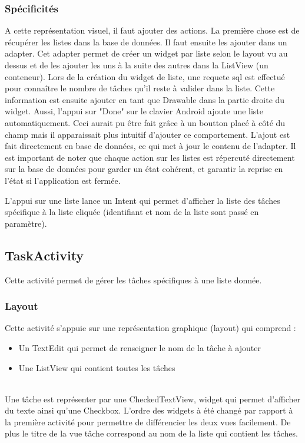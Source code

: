 \documentclass[a4paper, 11pt, french]{report}
\begin{document}
	\subsubsection{Spécificités}
	A cette représentation visuel, il faut ajouter des actions. 
	La première chose est de récupérer les listes dans la base de données. Il faut ensuite les ajouter dans un adapter.
	Cet adapter permet de créer un widget par liste selon le layout vu au dessus et de les ajouter les uns à la suite des autres dans la ListView (un conteneur). Lors de la création du widget de liste, une requete sql est effectué pour connaître le nombre de tâches qu'il reste à valider dans la liste. Cette information est ensuite ajouter en tant que Drawable dans la partie droite du widget.
	Aussi, l'appui sur "Done" sur le clavier Android ajoute une liste automatiquement. Ceci aurait pu être fait grâce à un boutton placé à côté du champ mais il apparaissait plus intuitif d'ajouter ce comportement. L'ajout est fait directement en base de données, ce qui met à jour le contenu de l'adapter.
	Il est important de noter que chaque action sur les listes est répercuté directement sur la base de données pour garder un état cohérent, et garantir la reprise en l'état si l'application est fermée.
	
	L'appui sur une liste lance un Intent qui permet d'afficher la liste des tâches spécifique à la liste cliquée (identifiant et nom de la liste sont passé en paramètre).
	
\subsection{TaskActivity}
Cette activité permet de gérer les tâches spécifiques à une liste donnée.
	\subsubsection{Layout}
	Cette activité s'appuie sur une représentation graphique (layout) qui comprend : 
	\begin{itemize}
		\item Un TextEdit qui permet de renseigner le nom de la tâche à ajouter
		\item Une ListView qui contient toutes les tâches
	\end{itemize}
	~\\
	Une tâche est représenter par une CheckedTextView, widget qui permet d'afficher du texte ainsi qu'une Checkbox.
	L'ordre des widgets à été changé par rapport à la première activité pour permettre de différencier les deux vues facilement. De plus le titre de la vue tâche correspond au nom de la liste qui contient les tâches. 
	
\end{document}
